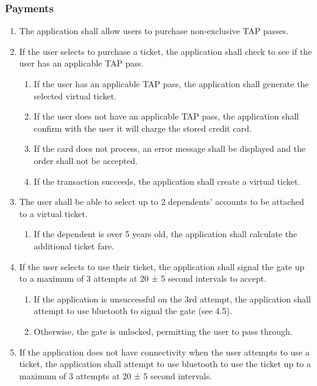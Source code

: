 	\subsubsection{Payments}\begin{enumerate}
		\item The application shall allow users to purchase non-exclusive TAP passes.
		\item If the user selects to purchase a ticket, the application shall check to see if the user has an applicable TAP pass.
			\begin{enumerate}
				\item If the user has an applicable TAP pass, the application shall generate the selected virtual ticket.
				\item If the user does not have an applicable TAP pass, the application shall confirm with the user it will charge the stored credit card.
				\item If the card does not process, an error message shall be displayed and the order shall not be accepted. 
				\item If the transaction succeeds, the application shall create a virtual ticket. 
			\end{enumerate}
		\item The user shall be able to select up to 2 dependents’ accounts to be attached to a virtual ticket.
			\begin{enumerate}
				\item If the dependent is over 5 years old, the application shall calculate the additional ticket fare.
			\end{enumerate}
		\item If the user selects to use their ticket, the application shall signal the gate up to a maximum of 3 attempts at 20 ± 5 second intervals to accept.
			\begin{enumerate}
				\item If the application is unsuccessful on the 3rd attempt, the application shall attempt to use bluetooth to signal the gate (see 4.5).
				\item Otherwise, the gate is unlocked, permitting the user to pass through.
			\end{enumerate}
		\item If the application does not have connectivity when the user attempts to use a ticket, the application shall attempt to use bluetooth to use the ticket up to a maximum of 3 attempts at 20 ± 5 second intervals.
			\begin{enumerate}

\end{enumerate}
\end{enumerate}
